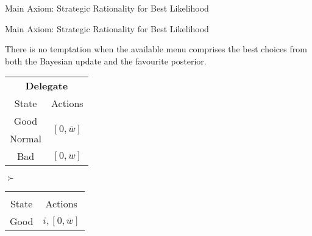 \documentclass[usenames,dvipsnames,aspectratio=169,11pt, envcountsect, handout]{beamer}
\begin{document}
\begin{frame}{Main Axiom: Strategic Rationality for Best Likelihood}
	\begin{flushright}
		\hyperlink{srblapp}{}
	\end{flushright}

\end{frame}

\begin{frame}[noframenumbering]{Main Axiom: Strategic Rationality for Best Likelihood}

	\begin{axiom}
		There is no temptation when the available menu comprises the best choices from both the Bayesian update and the favourite posterior.
	\end{axiom}

	\vfill

	\begin{table}[H]
		\centering
		\begin{minipage}{0.4\textwidth}
			\centering
			\begin{tabular}{c | c}
				\multicolumn{2}{c}{\textbf{Delegate}}                                                     \\
				State                & Actions                                                            \\
				\hline
				{\color{blue}Good}   & \multirow{2}{*}{{\color{blue}\( \left[0, \overline{w} \right] \)}} \\
				{\color{blue}Normal} &                                                                    \\
				Bad                  & \( \left[0, w \right]\)                                            \\
			\end{tabular}
			\vspace{0.5cm} %
		\end{minipage}%
		\( \succ \)
		\begin{minipage}{0.4\textwidth}
			\centering
			\begin{tabular}{c | c}
				\multicolumn{2}{c}{}                                                                          \\
				State                & Actions                                                                \\
				\hline
				{\color{blue}Good}   & \multirow{2}{*}{{\color{blue}\( i, \left[ 0, \overline{w} \right] \)}} \\

\end{tabular}
\end{minipage}
\end{table}
\end{frame}
\end{document}
